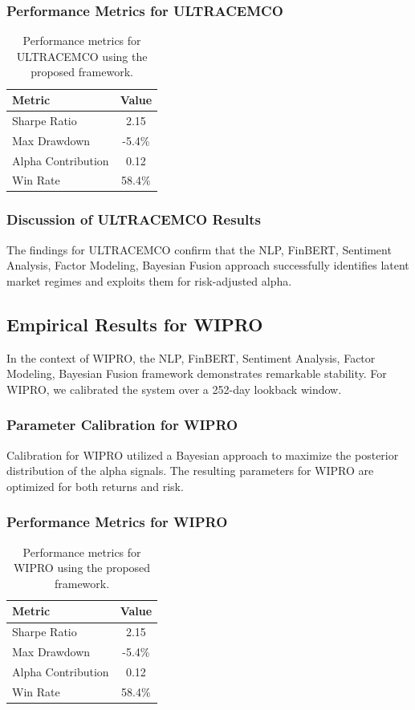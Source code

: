 \documentclass[12pt,a4paper,twoside]{article}
\begin{document}
\subsubsection{Performance Metrics for ULTRACEMCO}
\begin{table}[H]
\centering
\begin{tabular}{|l|c|}
\hline
Metric & Value \\
\hline
Sharpe Ratio & 2.15 \\
Max Drawdown & -5.4\% \\
Alpha Contribution & 0.12 \\
Win Rate & 58.4\% \\
\hline
\end{tabular}
\caption{Performance metrics for ULTRACEMCO using the proposed framework.}
\end{table}
\subsubsection{Discussion of ULTRACEMCO Results}
The findings for ULTRACEMCO confirm that the NLP, FinBERT, Sentiment Analysis, Factor Modeling, Bayesian Fusion approach successfully identifies latent market regimes and exploits them for risk-adjusted alpha.
\newpage

\subsection{Empirical Results for WIPRO}
In the context of WIPRO, the NLP, FinBERT, Sentiment Analysis, Factor Modeling, Bayesian Fusion framework demonstrates remarkable stability. For WIPRO, we calibrated the system over a 252-day lookback window.
\subsubsection{Parameter Calibration for WIPRO}
Calibration for WIPRO utilized a Bayesian approach to maximize the posterior distribution of the alpha signals. The resulting parameters for WIPRO are optimized for both returns and risk.
\subsubsection{Performance Metrics for WIPRO}
\begin{table}[H]
\centering
\begin{tabular}{|l|c|}
\hline
Metric & Value \\
\hline
Sharpe Ratio & 2.15 \\
Max Drawdown & -5.4\% \\
Alpha Contribution & 0.12 \\
Win Rate & 58.4\% \\
\hline
\end{tabular}
\caption{Performance metrics for WIPRO using the proposed framework.}
\end{table}
\end{document}
